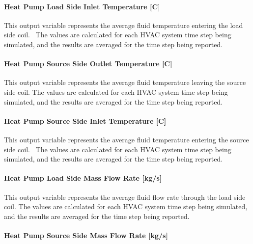\paragraph{Heat Pump Load Side Inlet Temperature {[}C{]}}\label{water-to-water-heat-pump-load-side-inlet-temperature-c-1}

This output variable represents the average fluid temperature entering the load side coil.~ The values are calculated for each HVAC system time step being simulated, and the results are averaged for the time step being reported.

\paragraph{Heat Pump Source Side Outlet Temperature {[}C{]}}\label{water-to-water-heat-pump-source-side-outlet-temperature-c-1}

This output variable represents the average fluid temperature leaving the source side coil. The values are calculated for each HVAC system time step being simulated, and the results are averaged for the time step being reported.

\paragraph{Heat Pump Source Side Inlet Temperature {[}C{]}}\label{water-to-water-heat-pump-source-side-inlet-temperature-c-1}

This output variable represents the average fluid temperature entering the source side coil.~ The values are calculated for each HVAC system time step being simulated, and the results are averaged for the time step being reported.

\paragraph{Heat Pump Load Side Mass Flow Rate {[}kg/s{]}}\label{water-to-water-heat-pump-load-side-mass-flow-rate-kgs-1}

This output variable represents the average fluid flow rate through the load side coil. The values are calculated for each HVAC system time step being simulated, and the results are averaged for the time step being reported.

\paragraph{Heat Pump Source Side Mass Flow Rate {[}kg/s{]}}\label{water-to-water-heat-pump-source-side-mass-flow-rate-kgs-1}


